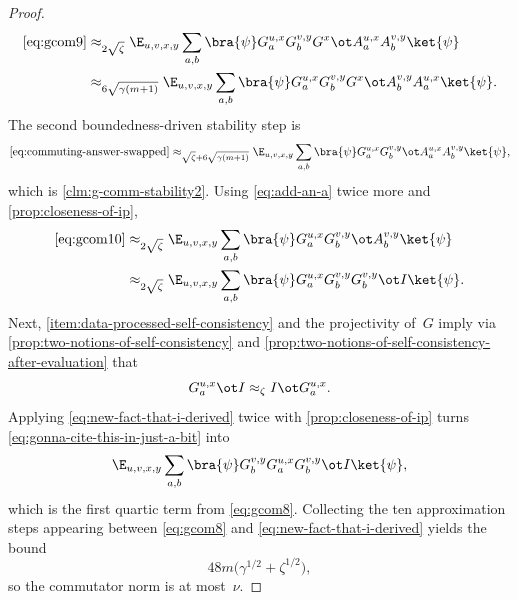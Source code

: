 \begin{proof}
	\begin{align}
		\eqref{eq:gcom9}
		 & \approx_{2\sqrt{\zeta}}
		\E_{u,v,x,y} \sum_{a,b}
		\bra{\psi} G_a^{u,x} G_b^{v,y} G^x \ot A_a^{u,x} A_b^{v,y} \ket{\psi}\nonumber \\
		 & \approx_{6\sqrt{\gamma(m+1)}}
		\E_{u,v,x,y} \sum_{a,b}
		\bra{\psi} G_a^{u,x} G_b^{v,y} G^x \ot A_b^{v,y} A_a^{u,x} \ket{\psi}.
		\label{eq:commuting-answer-swapped}
	\end{align}
	The second boundedness-driven stability step is
	\begin{equation}
		\eqref{eq:commuting-answer-swapped}
		\approx_{\sqrt{\zeta}+6\sqrt{\gamma(m+1)}}
		\E_{u,v,x,y} \sum_{a,b}
		\bra{\psi} G_a^{u,x} G_b^{v,y} \ot A_a^{u,x} A_b^{v,y} \ket{\psi},
		\label{eq:gcom10}
	\end{equation}
	which is \ref{clm:g-comm-stability2}. Using \ref{eq:add-an-a} twice more and \ref{prop:closeness-of-ip},
	\begin{align}
		\eqref{eq:gcom10}
		 & \approx_{2\sqrt{\zeta}}
		\E_{u,v,x,y} \sum_{a,b}
		\bra{\psi} G_a^{u,x} G_b^{v,y} \ot A_b^{v,y} \ket{\psi}\nonumber \\
		 & \approx_{2\sqrt{\zeta}}
		\E_{u,v,x,y} \sum_{a,b}
		\bra{\psi} G_a^{u,x} G_b^{v,y} G_b^{v,y} \ot I \ket{\psi}.
		\label{eq:gonna-cite-this-in-just-a-bit}
	\end{align}
	Next, \ref{item:data-processed-self-consistency} and the projectivity of~$G$ imply via \ref{prop:two-notions-of-self-consistency} and \ref{prop:two-notions-of-self-consistency-after-evaluation} that
	\begin{equation}\label{eq:new-fact-that-i-derived}
		G_a^{u,x} \ot I \approx_\zeta I \ot G_a^{u,x}.
	\end{equation}
	Applying \ref{eq:new-fact-that-i-derived} twice with \ref{prop:closeness-of-ip} turns \ref{eq:gonna-cite-this-in-just-a-bit} into
	\[
		\E_{u,v,x,y} \sum_{a,b}
		\bra{\psi} G_b^{v,y} G_a^{u,x} G_b^{v,y} \ot I \ket{\psi},
	\]
	which is the first quartic term from \ref{eq:gcom8}. Collecting the ten approximation steps appearing between \ref{eq:gcom8} and \ref{eq:new-fact-that-i-derived} yields the bound
	\[
		48m\bigl(\gamma^{1/2}+\zeta^{1/2}\bigr),
	\]
	so the commutator norm is at most~$\nu$.
\end{proof}

